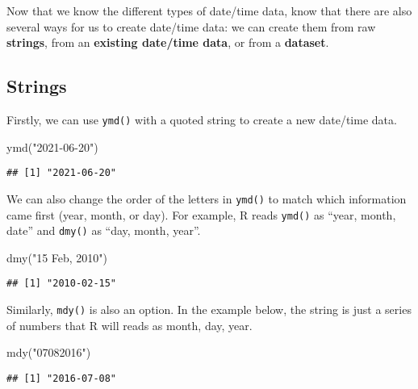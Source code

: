 \documentclass[
]{book}
\newenvironment{Shaded}{\begin{snugshade}}{\end{snugshade}}
\newcommand{\FunctionTok}[1]{\textcolor[rgb]{0.00,0.00,0.00}{#1}}
\newcommand{\NormalTok}[1]{#1}
\newcommand{\StringTok}[1]{\textcolor[rgb]{0.31,0.60,0.02}{#1}}
\begin{document}
Now that we know the different types of date/time data, know that there are also several ways for us to create date/time data: we can create them from raw \textbf{strings}, from an \textbf{existing date/time data}, or from a \textbf{dataset}.

\hypertarget{strings-1}{%
\subsection{Strings}\label{strings-1}}

Firstly, we can use \texttt{ymd()} with a quoted string to create a new date/time data.

\begin{Shaded}
\begin{Highlighting}[]
\FunctionTok{ymd}\NormalTok{(}\StringTok{"2021{-}06{-}20"}\NormalTok{)}
\end{Highlighting}
\end{Shaded}

\begin{verbatim}
## [1] "2021-06-20"
\end{verbatim}

We can also change the order of the letters in \texttt{ymd()} to match which information came first (year, month, or day). For example, R reads \texttt{ymd()} as ``year, month, date'' and \texttt{dmy()} as ``day, month, year''.

\begin{Shaded}
\begin{Highlighting}[]
\FunctionTok{dmy}\NormalTok{(}\StringTok{"15 Feb, 2010"}\NormalTok{)}
\end{Highlighting}
\end{Shaded}

\begin{verbatim}
## [1] "2010-02-15"
\end{verbatim}

Similarly, \texttt{mdy()} is also an option. In the example below, the string is just a series of numbers that R will reads as month, day, year.

\begin{Shaded}
\begin{Highlighting}[]
\FunctionTok{mdy}\NormalTok{(}\StringTok{"07082016"}\NormalTok{)}
\end{Highlighting}
\end{Shaded}

\begin{verbatim}
## [1] "2016-07-08"
\end{verbatim}
\end{document}
